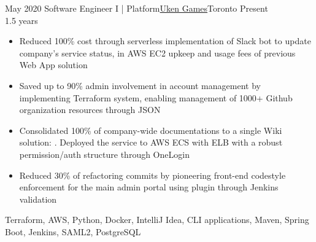 %
%
%
\begin{experiences}
  \experience
    {May 2020}   {Software Engineer I | Platform}{\href{https://uken.com}{Uken Games}}{Toronto}
    {Present \\ 1.5 years} {
                    \begin{itemize}
                        \item Reduced 100\% cost through serverless implementation of Slack bot to update company's service status, in AWS EC2 upkeep and usage fees of previous Web App solution
                        
                        \item Saved up to 90\% admin involvement in account management by implementing Terraform system, enabling management of 1000+ Github organization resources through JSON
                        
                        \item Consolidated 100\% of company-wide documentations to a single Wiki solution: . Deployed the service to AWS ECS with ELB with a robust permission/auth structure through OneLogin 

                        \item Reduced 30\% of refactoring commits by pioneering front-end codestyle enforcement for the main admin portal using   plugin through Jenkins validation
                    \end{itemize}
                    }
                    {Terraform, AWS, Python, Docker, IntelliJ Idea, CLI applications, Maven, Spring Boot, Jenkins, SAML2, PostgreSQL}
\end{experiences}
